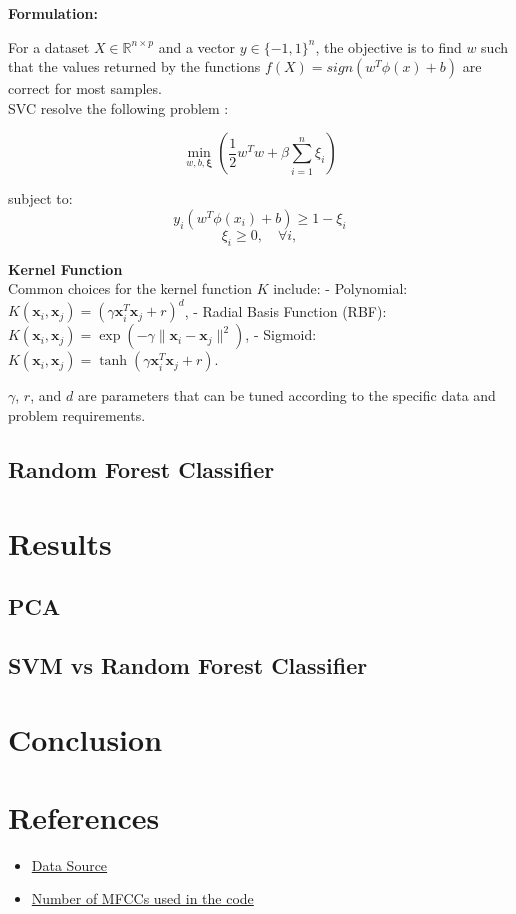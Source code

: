 \documentclass[11pt]{article}
\newcommand{\R}{\mathbb{R}}
\begin{document}
\noindent
\textbf{Formulation:}

For a dataset \(X \in \R^{n \times p} \) and a vector $y \in \{-1, 1\}^n$, the objective is to find $w$ such that the values returned by the functions $f(X) = sign(w^T\phi(x) + b)$ are correct for most samples.\\
SVC resolve the following problem :

\begin{equation}
\min_{w, b, \boldsymbol{\xi}} \left( \frac{1}{2} w^T w + \beta \sum_{i=1}^{n} \xi_i \right)
\end{equation}

subject to:
\[
y_i (w^T \phi(x_i) + b) \geq 1 - \xi_i
\]
\[
\xi_i \geq 0, \quad \forall i,
\]


\noindent
\textbf{Kernel Function}\\
Common choices for the kernel function \(K\) include:
- Polynomial: \(K(\mathbf{x}_i, \mathbf{x}_j) = (\gamma \mathbf{x}_i^T \mathbf{x}_j + r)^d\),
- Radial Basis Function (RBF): \(K(\mathbf{x}_i, \mathbf{x}_j) = \exp(-\gamma \|\mathbf{x}_i - \mathbf{x}_j\|^2)\),
- Sigmoid: \(K(\mathbf{x}_i, \mathbf{x}_j) = \tanh(\gamma \mathbf{x}_i^T \mathbf{x}_j + r)\).

\(\gamma\), \(r\), and \(d\) are parameters that can be tuned according to the specific data and problem requirements.


\subsection{Random Forest Classifier}

\section{Results}
\subsection{PCA}
 
\subsection{SVM vs Random Forest Classifier}

\section{Conclusion}

\newpage
\section{References}
\begin{itemize}
    \item \href{https://huggingface.co/datasets/common_language}{Data Source}
    \item \href{https://ietresearch.onlinelibrary.wiley.com/doi/full/10.1049/tje2.12082#:~:text=All\%20performance\%20metrics\%20gave\%20the,studies\%20use\%20only\%2013\%20MFCCs}{Number of MFCCs used in the code}
\end{itemize}
\end{document}
